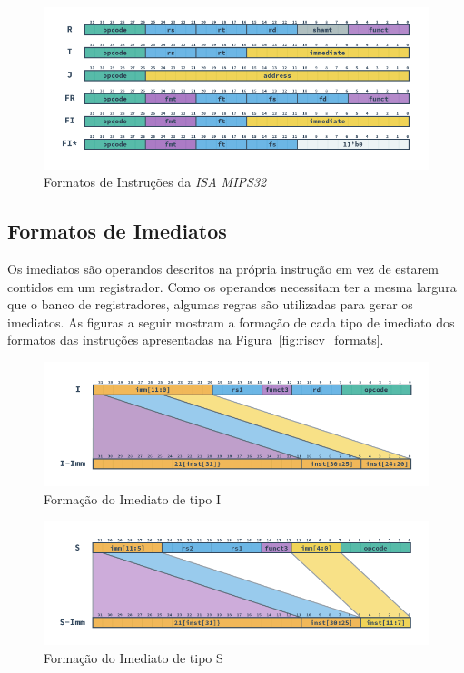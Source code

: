     \begin{figure}[H]
    \centering
        \includegraphics[width=.8\linewidth]{../images/MIPS_Formats.png}
        \caption{Formatos de Instruções da \textit{ISA MIPS32}}\label{fig:mips_formats}
    \end{figure}

    \subsection{Formatos de Imediatos}
    { Os imediatos são operandos descritos na própria instrução em vez de
        estarem contidos em um registrador. Como os operandos necessitam ter
        a mesma largura que o banco de registradores, algumas regras são
        utilizadas para gerar os imediatos. As figuras a seguir mostram a
        formação de cada tipo de imediato dos formatos das instruções
        apresentadas na Figura~\ref{fig:riscv_formats}.
    }

    \begin{figure}[H]
    \centering
        \includegraphics[width=.9\linewidth]{../images/RV_I_Imm.png}
        \caption{Formação do Imediato de tipo I}\label{fig:riscv_i_imm}
    \end{figure}

    \begin{figure}[H]
    \centering
        \includegraphics[width=.9\linewidth]{../images/RV_S_Imm.png}
        \caption{Formação do Imediato de tipo S}\label{fig:riscv_s_imm}
    \end{figure}

